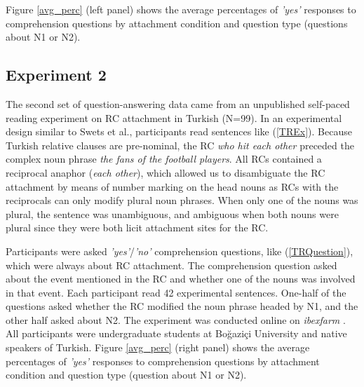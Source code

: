 \documentclass[11pt]{article}\usepackage[]{graphicx}\usepackage[]{color}
\begin{document}
Figure \ref{avg_perc} (left panel) shows the average percentages of \textit{'yes'} responses to comprehension questions by attachment condition and question type (questions about N1 or N2).


\subsection{Experiment 2}
The second set of question-answering data came from an unpublished self-paced reading experiment on RC attachment in Turkish (N=99).
In an experimental design similar to Swets et al., participants read sentences like (\ref{TREx}). Because Turkish relative clauses are pre-nominal, the RC \textit{who hit each other} preceded the complex noun phrase \textit{the fans of the football players}. All RCs contained a reciprocal anaphor (\textit{each other}), which allowed us to disambiguate the RC attachment by means of number marking on the head nouns as RCs with the reciprocals can only modify plural noun phrases. When only one of the nouns was plural, the sentence was unambiguous, and ambiguous when both nouns were plural since they were both licit attachment sites for the RC. 

Participants were asked \textit{'yes'}/\textit{'no'} comprehension questions, like (\ref{TRQuestion}), which were always about RC attachment. The comprehension question asked about the event mentioned in the RC and whether one of the nouns was involved in that event.
Each participant read 42 experimental sentences. One-half of the questions asked whether the RC modified the noun phrase headed by N1, and the other half asked about N2.
The experiment was conducted online on \textit{ibexfarm} \citep{ibexfarm}. All participants were undergraduate students at Boğaziçi University and native speakers of Turkish.
Figure \ref{avg_perc} (right panel) shows the average percentages of \textit{'yes'} responses to comprehension questions by attachment condition and question type (question about N1 or N2).
\end{document}
